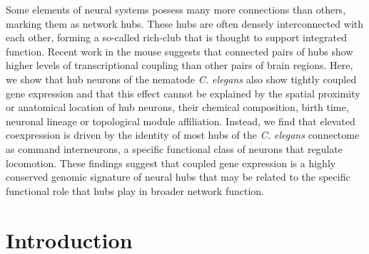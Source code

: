 \documentclass[10pt,letterpaper]{article}
\begin{document}
Some elements of neural systems possess many more connections than others, marking them as network hubs.
These hubs are often densely interconnected with each other, forming a so-called rich-club that is thought to support integrated function.
Recent work in the mouse suggests that connected pairs of hubs show higher levels of transcriptional coupling than other pairs of brain regions.
Here, we show that hub neurons of the nematode \textit{C. elegans} also show tightly coupled gene expression and that this effect cannot be explained by the spatial proximity or anatomical location of hub neurons, their chemical composition, birth time, neuronal lineage or topological module affiliation.
Instead, we find that elevated coexpression is driven by the identity of most hubs of the \textit{C. elegans} connectome as command interneurons, a specific functional class of neurons that regulate locomotion.
These findings suggest that coupled gene expression is a highly conserved genomic signature of neural hubs that may be related to the specific functional role that hubs play in broader network function.

\linenumbers

\section*{Introduction}
\end{document}
